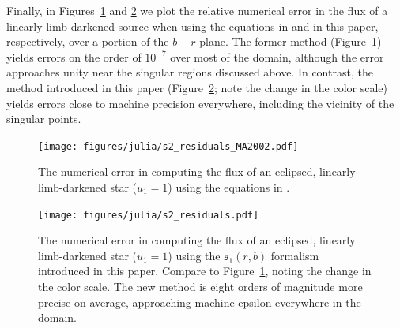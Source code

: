 \documentclass[modern]{aastex61}
\begin{document}
Finally, in Figures~\ref{fig:s2_plot_MA2002} and \ref{fig:s2_plot} we plot
the relative numerical error in the flux of a linearly limb-darkened source
when using the equations in \citet{MandelAgol2002} and in this paper,
respectively, over a portion of the $b-r$ plane. The former method 
(Figure~\ref{fig:s2_plot_MA2002}) yields errors
on the order of $10^{-7}$ over most of the domain, although the error approaches
unity near the singular regions discussed above. In contrast, the method introduced
in this paper (Figure~\ref{fig:s2_plot}; note the change in the color scale)
yields errors close to machine precision everywhere, including the vicinity of the
singular points.

\begin{figure}[p!]
    \begin{centering}
    \texttt{[image: figures/julia/s2\_residuals\_MA2002.pdf]}
    \caption{The numerical error in computing the flux of an eclipsed, linearly
             limb-darkened star ($u_1=1$) using the equations in \citet{MandelAgol2002}.
             \label{fig:s2_plot_MA2002}}
    \end{centering}
\end{figure}

\begin{figure}[p!]
    \begin{centering}
    \texttt{[image: figures/julia/s2\_residuals.pdf]}
    \caption{The numerical error in computing the flux of an eclipsed, linearly
    limb-darkened star ($u_1=1$) using the $\mathfrak{s}_1(r,b)$ formalism introduced in this
    paper. Compare to Figure~\ref{fig:s2_plot_MA2002}, noting the change in the color
    scale. The new method is eight orders of magnitude more precise on average,
    approaching machine epsilon everywhere in the domain. 
    \label{fig:s2_plot}}
    \end{centering}
\end{figure}

\end{document}
